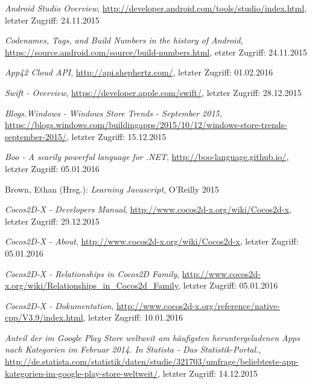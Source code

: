 \begin{thebibliography}{}

\emph{Android Studio Overview},
\url{http://developer.android.com/tools/studio/index.html}, letzter Zugriff: 24.11.2015

\emph{Codenames, Tags, and Build Numbers in the history of Android},
\url{https://source.android.com/source/build-numbers.html}, etzter Zugriff: 24.11.2015

\emph{App42 Cloud API},
\url{http://api.shephertz.com/}, letzter Zugriff: 01.02.2016

\emph{Swift - Overview},
\url{https://developer.apple.com/swift/}, letzter Zugriff: 28.12.2015

\emph{Blogs.Windows - Windows Store Trends - September 2015},
\url{https://blogs.windows.com/buildingapps/2015/10/12/windows-store-trends-september-2015/}, letzter Zugriff: 15.12.2015

\emph{Boo - A scarily powerful language for .NET},
\url{http://boo-language.github.io/}, letzter Zugriff: 05.01.2016

Brown, Ethan (Hrsg.): 
\emph{Learning Javascript}, O'Reilly 2015

\emph{Cocos2D-X - Developers Manual},
\url{http://www.cocos2d-x.org/wiki/Cocos2d-x}, letzter Zugriff: 29.12.2015

\emph{Cocos2D-X - About},
\url{http://www.cocos2d-x.org/wiki/Cocos2d-x}, letzter Zugriff: 05.01.2016

\emph{Cocos2D-X - Relationships in Cocos2D Family},
\url{http://www.cocos2d-x.org/wiki/Relationships_in_Cocos2d_Family}, letzter Zugriff: 05.01.2016

\emph{Cocos2D-X - Dokumentation},
\url{http://www.cocos2d-x.org/reference/native-cpp/V3.9/index.html}, letzter Zugriff: 10.01.2016

\emph{Anteil der im Google Play Store weltweit am häufigsten heruntergeladenen Apps nach Kategorien im Februar 2014. In Statista - Das Statistik-Portal.},
\url{http://de.statista.com/statistik/daten/studie/321703/umfrage/beliebteste-app-kategorien-im-google-play-store-weltweit/}, letzter Zugriff: 14.12.2015


\end{thebibliography}
